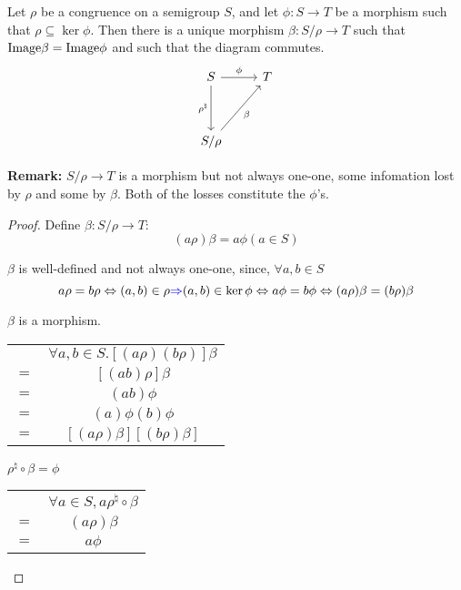 \begin{Them}\label{Them:1.5.3}
    Let $\rho$ be a congruence on a semigroup $S$, and let $\phi: S \to T$ be a morphism such that $\rho \subseteq \ker \phi$. Then there is a unique morphism $\beta:S/\rho \to T$ such that $\mathrm{Image} \beta = \mathrm{Image} \phi$ and such that the diagram commutes.
    \[\begin{tikzcd}
        S        
        \arrow[dd, "\rho^{\natural}"'] 
        \arrow[r,"\phi"] &
        T   \\
        \\
        S/\rho
        \arrow[uur, "\beta"']
    \end{tikzcd}\]

    \textbf{Remark:} $S/\rho \rightarrow T$ is a morphism but not always one-one, some infomation lost by $\rho$ and some by $\beta$. Both of the losses constitute the $\phi$'s.
    \begin{proof}
        Define $\beta: S/\rho\rightarrow T$:
        \[
            (a \rho) \beta = a\phi (a \in S)
        \]

        $\beta$ is well-defined and not always one-one, since, $\forall a,b \in S$
        \[
            a\rho = b \rho \Leftrightarrow (a,b) \in \rho \textcolor{blue}{\Rightarrow} (a,b) \in \ker \phi \Leftrightarrow a \phi = b \phi \Leftrightarrow (a\rho)\beta = (b\rho)\beta
        \]

        $\beta$ is a morphism. 

        \begin{center}
        \begin{tabular}{c c}
            & $\forall a,b\in S. [(a\rho)(b\rho)]\beta$   \\
            $=$ & $[(a b)\rho]\beta$    \\
            $=$ & $(a b)\phi$   \\
            $=$ & $(a)\phi (b)\phi$ \\
            $=$ & $[(a\rho)\beta][(b\rho)\beta]$
        \end{tabular}
        \end{center}
        
        $\rho^{\natural} \circ \beta = \phi$
        
        \begin{center}
            \begin{tabular}{c c}
                & $\forall a \in S, a \rho^{\natural} \circ \beta$ \\
                $=$ & $(a\rho)\beta$    \\
                $=$ & $a\phi$
            \end{tabular}
        \end{center}


\end{proof}
\end{Them}

